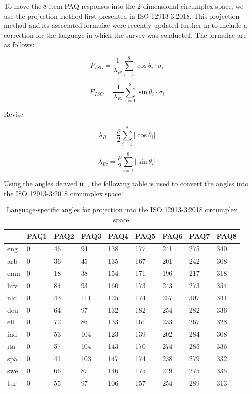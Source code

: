 \documentclass[
  authoryear,
  preprint,
  3p]{elsarticle}
\begin{document}
To move the 8-item PAQ responses into the 2-dimensional circumplex
space, we use the projection method first presented in ISO 12913-3:2018.
This projection method and its associated formulae were recently updated
further in \citet{Mitchell2023Testing} to include a correction for the
language in which the survey was conducted. The formulae are as follows:

\[
P_{ISO} = \frac{1}{\lambda_{Pl}} \sum_{i=1}^{8} \cos \theta_i \cdot \sigma_i
\]

\[
E_{ISO} = \frac{1}{\lambda_{Ev}} \sum_{i=1}^{8} \sin \theta_i \cdot \sigma_i 
\]

Revise

\[
\lambda_{Pl} = \frac{\rho}{2} \sum_{i=1}^{8} |\cos \theta_i|
\]

\[
\lambda_{Ev} = \frac{\rho}{2} \sum_{i=1}^{8} |\sin \theta_i|
\]

Using the angles derived in \citet{Mitchell2023Testing}, the following
table is used to convert the angles into the ISO 12913-3:2018 circumplex
space:

\begin{longtable}[]{@{}lllllllll@{}}

\caption{\label{tbl-lang-angles}Language-specific angles for projection
into the ISO 12913-3:2018 circumplex space.}

\tabularnewline

\toprule\noalign{}
& PAQ1 & PAQ2 & PAQ3 & PAQ4 & PAQ5 & PAQ6 & PAQ7 & PAQ8 \\
\midrule\noalign{}
\endhead
\bottomrule\noalign{}
\endlastfoot
eng & 0 & 46 & 94 & 138 & 177 & 241 & 275 & 340 \\
arb & 0 & 36 & 45 & 135 & 167 & 201 & 242 & 308 \\
cmn & 0 & 18 & 38 & 154 & 171 & 196 & 217 & 318 \\
hrv & 0 & 84 & 93 & 160 & 173 & 243 & 273 & 354 \\
nld & 0 & 43 & 111 & 125 & 174 & 257 & 307 & 341 \\
deu & 0 & 64 & 97 & 132 & 182 & 254 & 282 & 336 \\
ell & 0 & 72 & 86 & 133 & 161 & 233 & 267 & 328 \\
ind & 0 & 53 & 104 & 123 & 139 & 202 & 284 & 308 \\
ita & 0 & 57 & 104 & 143 & 170 & 274 & 285 & 336 \\
spa & 0 & 41 & 103 & 147 & 174 & 238 & 279 & 332 \\
swe & 0 & 66 & 87 & 146 & 175 & 249 & 275 & 335 \\
tur & 0 & 55 & 97 & 106 & 157 & 254 & 289 & 313 \\

\end{longtable}
\end{document}
